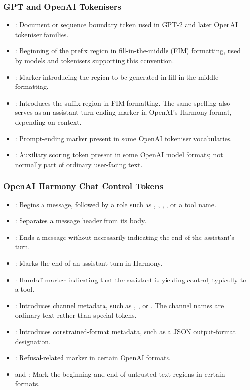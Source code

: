 \subsubsection{GPT and OpenAI Tokenisers}

\begin{itemize}
    \item {}: Document or sequence boundary token used in GPT-2 and later OpenAI tokeniser families.
    \item {}: Beginning of the prefix region in fill-in-the-middle (FIM) formatting, used by models and tokenisers supporting this convention.
    \item {}: Marker introducing the region to be generated in fill-in-the-middle formatting.
    \item {}: Introduces the suffix region in FIM formatting. The same spelling also serves as an assistant-turn ending marker in OpenAI's Harmony format, depending on context.
    \item {}: Prompt-ending marker present in some OpenAI tokeniser vocabularies.
    \item {}: Auxiliary scoring token present in some OpenAI model formats; not normally part of ordinary user-facing text.
\end{itemize}

\subsubsection{OpenAI Harmony Chat Control Tokens}

\begin{itemize}
    \item {}: Begins a message, followed by a role such as , , , , or a tool name.
    \item {}: Separates a message header from its body.
    \item {}: Ends a message without necessarily indicating the end of the assistant's turn.
    \item {}: Marks the end of an assistant turn in Harmony.
    \item {}: Handoff marker indicating that the assistant is yielding control, typically to a tool.
    \item {}: Introduces channel metadata, such as , , or . The channel names are ordinary text rather than special tokens.
    \item {}: Introduces constrained-format metadata, such as a JSON output-format designation.
    \item {}: Refusal-related marker in certain OpenAI formats.
    \item {} and : Mark the beginning and end of untrusted text regions in certain formats.
\end{itemize}

